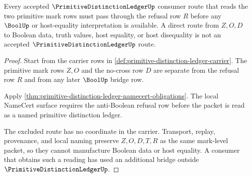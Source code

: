 \begin{theorem}
\label{thm:primitive-distinction-ledger-no-boolean-collapse}
Every accepted $\PrimitiveDistinctionLedgerUp$ consumer route that reads the two primitive mark rows must pass through the refusal row $R$ before any $\BoolUp$ or host-equality interpretation is available. A direct route from $Z,O,D$ to Boolean data, truth values, host equality, or host disequality is not an accepted $\PrimitiveDistinctionLedgerUp$ route.
\end{theorem}
\begin{proof}
Start from the carrier rows in \autoref{def:primitive-distinction-ledger-carrier}. The primitive mark rows $Z,O$ and the no-cross row $D$ are separate from the refusal row $R$ and from any later $\BoolUp$ bridge row.

Apply \autoref{thm:primitive-distinction-ledger-namecert-obligations}. The local NameCert surface requires the anti-Boolean refusal row before the packet is read as a named primitive distinction ledger.

The excluded route has no coordinate in the carrier. Transport, replay, provenance, and local naming preserve $Z,O,D,T,R$ as the same mark-level packet, so they cannot manufacture Boolean data or host equality. A consumer that obtains such a reading has used an additional bridge outside $\PrimitiveDistinctionLedgerUp$.
\end{proof}


